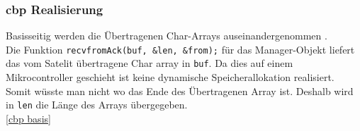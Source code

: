 \subsubsection{cbp Realisierung}
Basisseitig werden die Übertragenen Char-Arrays \grqq auseinandergenommen \grqq .\\ Die Funktion \texttt{recvfromAck(buf, &len, &from);} für das Manager-Objekt liefert das vom Satelit übertragene Char array in \texttt{buf}. Da dies auf einem Mikrocontroller geschieht ist keine dynamische Speicherallokation realisiert. Somit wüsste man nicht wo das Ende des Übertragenen Array ist. Deshalb wird in \texttt{len} die Länge des Arrays übergegeben.\\
 
\ref{cbp basis}